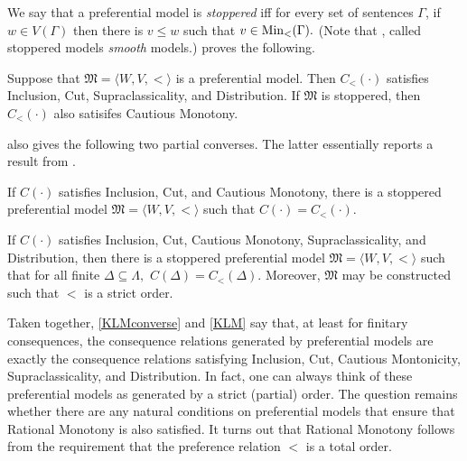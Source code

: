 We say that a preferential model is {\em stoppered} iff for every set of
sentences $\Gamma$, if $w\in V(\Gamma)$ then there is $v\leq w$ such that $v\in
\text{Min}_<(\Gamma).$ (Note that \citealp{kraus1990nonmonotonic}, called stoppered
models {\em smooth} models.) \citet{makinson1994general} proves the following.
\begin{theorem}\label{KLMconverse}
Suppose that $\mathfrak{M}=\langle W,V, < \rangle$ is a preferential model. Then
$C_<(\cdot)$ satisfies Inclusion, Cut, Supraclassicality, and Distribution. If
$\mathfrak{M}$ is stoppered, then $C_<(\cdot)$ also satisifes Cautious Monotony.
\end{theorem}
\citet{makinson1994general} also gives the following two partial converses. The
latter essentially reports a result from \citet{kraus1990nonmonotonic}.
\begin{theorem}
If $C(\cdot)$ satisfies Inclusion, Cut, and Cautious Monotony, there is a
stoppered preferential model $\mathfrak{M} = \langle W,V,< \rangle$ such that
$C(\cdot) = C_<(\cdot)$.
\end{theorem}
\begin{theorem}
  \label{KLM}
If $C(\cdot)$ satisfies Inclusion, Cut, Cautious Monotony, Supraclassicality,
and Distribution, then there is a stoppered preferential model
$\mathfrak{M}=\langle W,V,< \rangle$ such that for all finite $\Delta \subseteq
\Lambda,$ $C(\Delta)=C_<(\Delta).$ Moreover, $\mathfrak{M}$ may be constructed
such that $<$ is a strict order. 
\end{theorem}
Taken together, \autoref{KLMconverse} and \autoref{KLM} say that, at least for
finitary consequences, the consequence relations generated by preferential
models are exactly the consequence relations satisfying Inclusion, Cut, Cautious
Montonicity, Supraclassicality, and Distribution. In fact, one can always think
of these preferential models as generated by a strict (partial) order. The
question remains whether there are any natural conditions on preferential models
that ensure that Rational Monotony is also satisfied. It turns out that Rational
Monotony follows from the requirement that the preference relation $<$ is a
total order.

